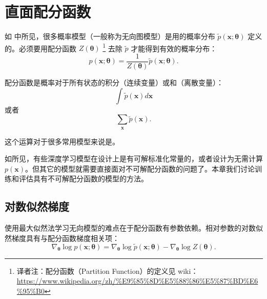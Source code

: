 \chapter{直面配分函数}
\label{chap:18}


如 中所见，很多概率模型（一般称为无向图模型）是用的概率分布 \(\widetilde{p}(\bm{x};\bm{\theta})\) 定义的。必须要用配分函数 \(Z(\bm{\theta})\) \footnote{译者注：配分函数（Partition Function）的定义见 wiki：\url{https://www.wikipedia.org/zh/\%E9\%85\%8D\%E5\%88\%86\%E5\%87\%BD\%E6\%95\%B0}} 去除 \(\widetilde{p}\) 才能得到有效的概率分布：
\begin{equation}
    p(\bm{x};\bm{\theta})
    = \frac{1}{Z(\bm{\theta})}\widetilde{p}(\bm{x};\bm{\theta}).
\end{equation}

配分函数是概率对于所有状态的积分（连续变量）或和（离散变量）： 
\begin{equation}
    \int\widetilde{p}(\bm{x})d\bm{x}
\end{equation}
 或者
 \begin{equation}
     \sum_{\bm{x}}\widetilde{p}(\bm{x}).
 \end{equation}

这个运算对于很多常用模型来说是。

如所见，有些深度学习模型在设计上是有可解标准化常量的，或者设计为无需计算 \(p(\bm{x})\)。但其它的模型就需要直接面对不可解配分函数的问题了。本章我们讨论训练和评估具有不可解配分函数的模型的方法。

\section{对数似然梯度}
\label{sec:18.1}

使用最大似然法学习无向模型的难点在于配分函数有参数依赖。相对参数的对数似然梯度具有与配分函数梯度相关项：
\begin{equation}
    \nabla_{\bm{\theta}}\log{p(\bm{x};\bm{\theta})}
    = \nabla_{\bm{\theta}}\log{\widetilde{p}(\bm{x};\bm{\theta})}
    - \nabla_{\bm{\theta}}\log{Z(\bm{\theta})}.
\end{equation}

